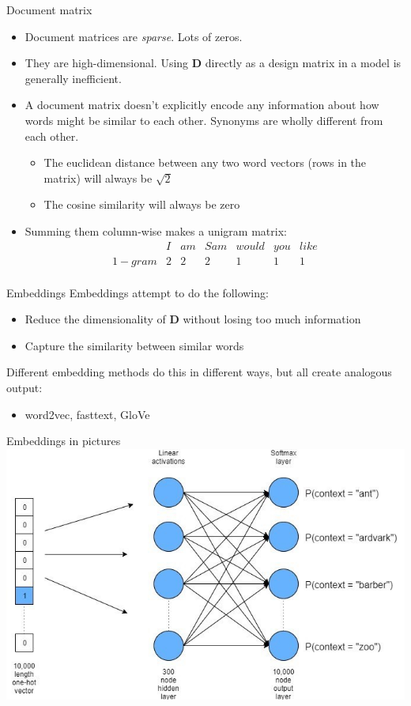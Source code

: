 \documentclass[10pt]{beamer}
\begin{document}
\begin{frame}{Document matrix}
\begin{itemize}
	\item Document matrices are \textit{sparse}.  Lots of zeros.  
	\item They are high-dimensional.  Using $\bm{D}$ directly as a design matrix in a model is generally inefficient.
	\item A document matrix doesn't explicitly encode any information about how words might be similar to each other.  Synonyms are wholly different from each other.
	\begin{itemize}
		\item The euclidean distance between any two word vectors (rows in the matrix) will always be $\sqrt{2}$
		\item The cosine similarity will always be zero
	\end{itemize}
	\item Summing them column-wise makes a unigram matrix:
	\[ 
\begin{array}{c|cccccc}
     & I & am & Sam & would & you & like \\
     \hline
1-gram    & 2 & 2  & 2   & 1     & 1   &  1 \\
\end{array}\] 
\end{itemize}
\end{frame}

\begin{frame}{Embeddings}
Embeddings attempt to do the following:
\begin{itemize}
\item Reduce the dimensionality of $\bm{D}$ without losing too much information
\item Capture the similarity between similar words
\end{itemize}
Different embedding methods do this in different ways, but all create analogous output:
\begin{itemize}
\item word2vec, fasttext, GloVe
\end{itemize}
\end{frame}

\begin{frame}{Embeddings in pictures}
\centering
\includegraphics[width=.9\textwidth]{embeddings_example.jpeg}
\end{frame}
\end{document}
